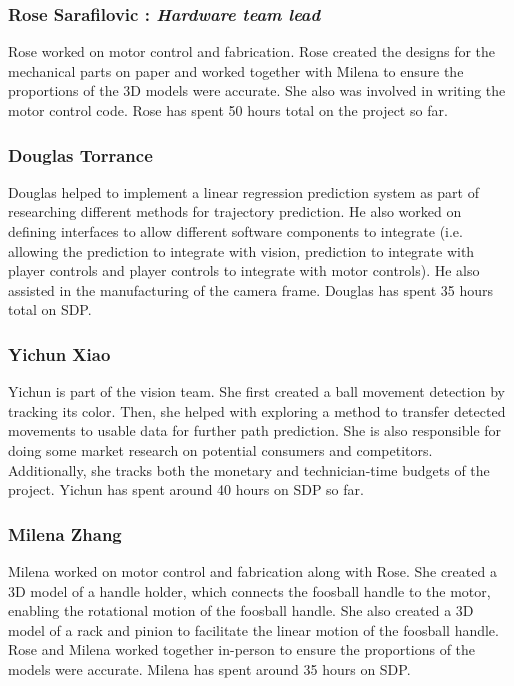 \documentclass{article}
\begin{document}
\subsubsection{Rose Sarafilovic : \emph{Hardware team lead} }Rose worked on motor control and fabrication. Rose created the designs for the mechanical parts on paper and worked together with Milena to ensure the proportions of the 3D models were accurate. She also was involved in writing the motor control code. Rose has spent 50 hours total on the project so far. 

\subsubsection{Douglas Torrance} Douglas helped to implement a linear regression prediction system as part of researching different methods for trajectory prediction. He also worked on defining interfaces to allow different software components to integrate (i.e. allowing the prediction to integrate with vision, prediction to integrate with player controls and player controls to integrate with motor controls). He also assisted in the manufacturing of the camera frame. Douglas has spent 35 hours total on SDP. 

\subsubsection{Yichun Xiao} Yichun is part of the vision team. She first created a ball movement detection by tracking its color. Then, she helped with exploring a method to transfer detected movements to usable data for further path prediction. She is also responsible for doing some market research on potential consumers and competitors. Additionally, she tracks both the monetary and technician-time budgets of the project. Yichun has spent around 40 hours on SDP so far.

\subsubsection{Milena Zhang} Milena worked on motor control and fabrication along with Rose. She created a 3D model of a handle holder, which connects the foosball handle to the motor, enabling the rotational motion of the foosball handle. She also created a 3D model of a rack and pinion to facilitate the linear motion of the foosball handle. Rose and Milena worked together in-person to ensure the proportions of the models were accurate. Milena has spent around 35 hours on SDP.
\end{document}
